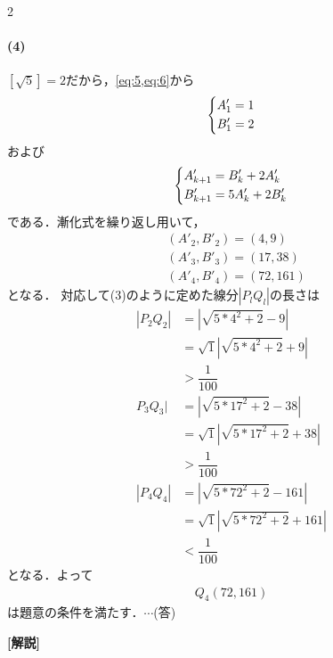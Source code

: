 \documentclass[../../main.tex]{subfiles}
\begin{document}
\begin{multicols}{2}
  \paragraph{(4)}
  $\left[\sqrt{5}\right]=2$だから，\cref{eq:5,eq:6}から
  \begin{align}
    \begin{dcases}
      A'_1 = 1 \\
      B'_1 = 2
    \end{dcases}
  \end{align}
  および
  \begin{align}
    \begin{dcases}
      A'_{k+1} = B'_{k}+2A'_{k} \\
      B'_{k+1} = 5A'_k+2B'_{k}
    \end{dcases}
  \end{align}
  である．漸化式を繰り返し用いて，
  \begin{align}
    & (A'_2, B'_2) = (4,9)    \\
    & (A'_3, B'_3) = (17,38)  \\
    & (A'_4, B'_4) = (72,161)
  \end{align}
  となる．
  対応して(3)のように定めた線分$|P_{l}Q_{l}|$の長さは
  \begin{align}
    |P_{2}Q_{2}|
    & = |\sqrt{5*4^2+2} - 9|              \\
    & = \sqrt{1}{|\sqrt{5*4^2+2} + 9|}    \\
    & > \dfrac{1}{100}                     \\
    P_{3}Q_{3}|
    & = |\sqrt{5*17^2+2} - 38|            \\
    & = \sqrt{1}{|\sqrt{5*17^2+2} + 38|}  \\
    & > \dfrac{1}{100}                     \\
    |P_{4}Q_{4}|
    & = |\sqrt{5*72^2+2} - 161|           \\
    & = \sqrt{1}{|\sqrt{5*72^2+2} + 161|} \\
    & < \dfrac{1}{100}
  \end{align}
  となる．よって
  \begin{align}
    Q_{4}(72,161)
  \end{align}
  は題意の条件を満たす．$\cdots$(答)

  {\bf [解説]}

  \newpage
\end{multicols}
\end{document}
